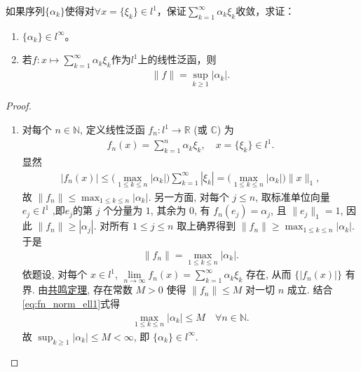 \documentclass[../../main.tex]{subfiles}%
\begin{document}
\begin{example}
如果序列$\{\alpha_k\}$使得对$\forall x=\{\xi_k\}\in l^1$，保证$\sum\limits_{k=1}^{\infty}\alpha_k\xi_k$收敛，求证：
\begin{enumerate}[(1)]
\item $\{\alpha_k\}\in l^\infty$。

\item 若$f:x\mapsto\sum\limits_{k=1}^{\infty}\alpha_k\xi_k$作为$l^1$上的线性泛函，则
\begin{align*}
\|f\|=\sup_{k\geqslant 1}|\alpha_k|.
\end{align*}
\end{enumerate}
\end{example}
\begin{proof}
\begin{enumerate}[(1)]
\item 对每个 $n\in\mathbb{N}$, 定义线性泛函 $f_n:l^1\to\mathbb{R}$ (或 $\mathbb{C}$) 为
\begin{align*}
f_n(x)=\sum\limits_{k=1}^{n}\alpha_k\xi_k,\quad x=\{\xi_k\}\in l^1.
\end{align*}
显然
\begin{align*}
|f_n(x)|\leqslant \bigl(\max_{1\leqslant k\leqslant n}|\alpha_k|\bigr)\sum\limits_{k=1}^{\infty}|\xi_k| = \bigl(\max_{1\leqslant k\leqslant n}|\alpha_k|\bigr)\|x\|_1,
\end{align*}
故 $\|f_n\|\leqslant \max_{1\leqslant k\leqslant n}|\alpha_k|$. 另一方面, 对每个 $j\leqslant n$, 取标准单位向量 $e_j\in l^1$ ,即$e_j$的第 $j$ 个分量为 $1$, 其余为 $0$, 有 $f_n(e_j)=\alpha_j$, 且 $\|e_j\|_1=1$, 因此 $\|f_n\|\geqslant |\alpha_j|$. 对所有 $1\leqslant j\leqslant n$ 取上确界得到 $\|f_n\|\geqslant \max_{1\leqslant k\leqslant n}|\alpha_k|$. 于是
\begin{align}\label{eq:fn_norm_ell1}
\|f_n\| = \max_{1\leqslant k\leqslant n}|\alpha_k|.
\end{align}
依题设, 对每个 $x\in l^1$, $\lim\limits_{n\to\infty}f_n(x)=\sum_{k=1}^{\infty}\alpha_k\xi_k$ 存在, 从而 $\{|f_n(x)|\}$ 有界. 由\hyperref[theorem:泛函分析--共鸣定理]{共鸣定理}, 存在常数 $M>0$ 使得 $\|f_n\|\leqslant M$ 对一切 $n$ 成立. 结合 \eqref{eq:fn_norm_ell1}式得
\begin{align*}
\max_{1\leqslant k\leqslant n}|\alpha_k|\leqslant M\quad \forall n\in \mathbb{N}.
\end{align*}
故 $\sup_{k\geqslant 1}|\alpha_k|\leqslant M<\infty$, 即 $\{\alpha_k\}\in l^{\infty}$.


\end{enumerate}
\end{proof}
\end{document}
